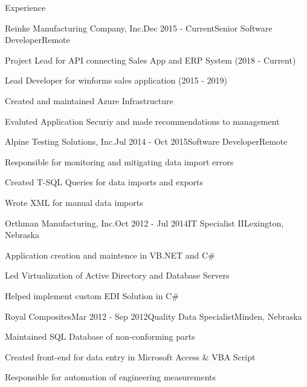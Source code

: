 \documentclass{resume} %
\begin{document}

\begin{rSection}{Experience}

\begin{rSubsection}{Reinke Manufacturing Company, Inc.}{Dec 2015 - Current}{Senior Software Developer}{Remote}
\item Project Lead for API connecting Sales App and ERP System (2018 - Current)
\item Lead Developer for winforms sales application (2015 - 2019)
\item Created and maintained Azure Infrastructure
\item Evaluted Application Securiy and made recommendations to management
\end{rSubsection}

\begin{rSubsection}{Alpine Testing Solutions, Inc.}{Jul 2014 - Oct 2015}{Software Developer}{Remote}
\item Responsible for monitoring and mitigating data import errors 
\item Created T-SQL Queries for data imports and exports
\item Wrote XML for manual data imports
\end{rSubsection}

\begin{rSubsection}{Orthman Manufacturing, Inc.}{Oct 2012 - Jul 2014}{IT Specialist II}{Lexington, Nebraska}
\item Application creation and maintence in VB.NET and C\#
\item Led Virtualization of Active Directory and Database Servers
\item Helped implement custom EDI Solution in C\#

\end{rSubsection}

\begin{rSubsection}{Royal Composites}{Mar 2012 - Sep 2012}{Quality Data Specialist}{Minden, Nebraska}
\item Maintained SQL Database of non-conforming parts
\item Created front-end for data entry in Microsoft Access \& VBA Script
\item Responsible for automation of engineering measurements
\end{rSubsection}


\end{rSection}
\end{document}
